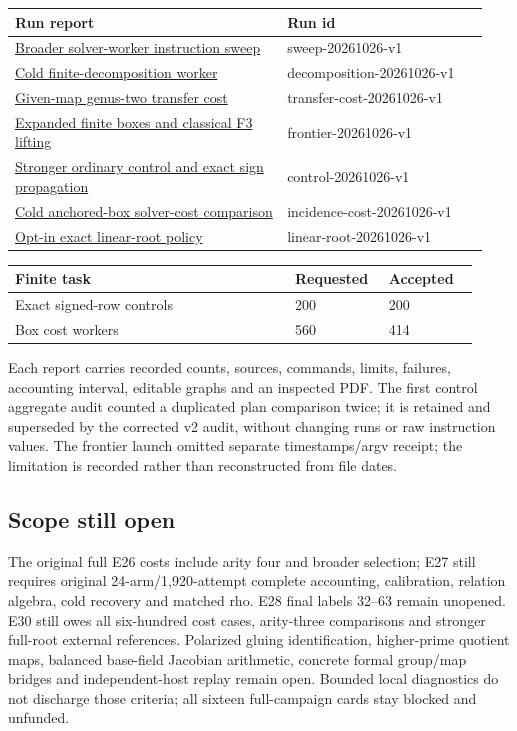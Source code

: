 \documentclass[
  10pt,
]{article}
\begin{document}
\begin{longtable}[]{@{}p{0.54\linewidth}p{0.40\linewidth}@{}}
\toprule\noalign{}
Run report & Run id \\
\midrule\noalign{}
\endhead
\bottomrule\noalign{}
\endlastfoot
\href{sweep/RESULTS.md}{Broader solver-worker instruction sweep} &
sweep-20261026-v1 \\
\href{decomposition/RESULTS.md}{Cold finite-decomposition worker} &
decomposition-20261026-v1 \\
\href{transfer/RESULTS.md}{Given-map genus-two transfer cost} &
transfer-cost-20261026-v1 \\
\href{frontier/RESULTS.md}{Expanded finite boxes and classical F3
lifting} & frontier-20261026-v1 \\
\href{controls/RESULTS.md}{Stronger ordinary control and exact sign
propagation} & control-20261026-v1 \\
\href{incidence-cost/RESULTS.md}{Cold anchored-box solver-cost
comparison} & incidence-cost-20261026-v1 \\
\href{linear-roots/RESULTS.md}{Opt-in exact linear-root policy} &
linear-root-20261026-v1 \\
\end{longtable}

\begin{longtable}[]{@{}p{0.56\linewidth}p{0.18\linewidth}p{0.18\linewidth}@{}}
\toprule\noalign{}
Finite task & Requested & Accepted \\
\midrule\noalign{}
\endhead
\bottomrule\noalign{}
\endlastfoot
Exact signed-row controls & 200 & 200 \\
Box cost workers & 560 & 414 \\
\end{longtable}

Each report carries recorded counts, sources, commands, limits,
failures, accounting interval, editable graphs and an inspected PDF. The
first control aggregate audit counted a duplicated plan comparison
twice; it is retained and superseded by the corrected v2 audit, without
changing runs or raw instruction values. The frontier launch omitted
separate timestamps/argv receipt; the limitation is recorded rather than
reconstructed from file dates.

\subsection{Scope still open}\label{scope-still-open}

The original full E26 costs include arity four and broader selection;
E27 still requires original 24-arm/1,920-attempt complete accounting,
calibration, relation algebra, cold recovery and matched rho. E28 final
labels 32--63 remain unopened. E30 still owes all six-hundred cost
cases, arity-three comparisons and stronger full-root external
references. Polarized gluing identification, higher-prime quotient maps,
balanced base-field Jacobian arithmetic, concrete formal group/map
bridges and independent-host replay remain open. Bounded local
diagnostics do not discharge those criteria; all sixteen full-campaign
cards stay blocked and unfunded.
\end{document}
